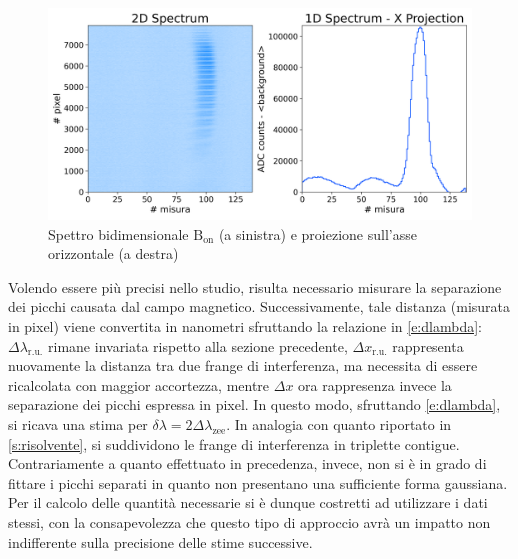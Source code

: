 \documentclass[twocolumn,10pt]{asme2ej}
\begin{document}
\begin{figure}
    \centering
    \includegraphics[width=\linewidth]{../Plots/Bon_2d_spectrum.png}
    \caption{Spettro bidimensionale $\text{B}_{\text{on}}$ (a sinistra) e proiezione sull'asse orizzontale (a destra)}
    \label{i:spettro2d_Bon}
    \vspace{-10pt}
\end{figure}

\noindent Volendo essere più precisi nello studio, risulta necessario misurare la separazione dei picchi causata dal
campo magnetico. Successivamente, tale distanza (misurata in pixel) viene convertita in nanometri sfruttando la
relazione in \autoref{e:dlambda}: $\Delta\lambda_{\text{r.u.}}$ rimane invariata rispetto alla sezione precedente,
$\Delta x_{\text{r.u.}}$ rappresenta nuovamente la distanza tra due frange di interferenza, ma necessita di essere
ricalcolata con maggior accortezza, mentre $\Delta x$ ora rappresenza invece la separazione dei picchi espressa in
pixel. In questo modo, sfruttando \autoref{e:dlambda}, si ricava una stima per $\delta\lambda = 2
\Delta\lambda_{\text{zee}}$. In analogia con quanto riportato in \autoref{s:risolvente}, si suddividono le frange di
interferenza in triplette contigue. Contrariamente a quanto effettuato in precedenza, invece, non si è in grado di
fittare i picchi separati in quanto non presentano una sufficiente forma gaussiana. Per il calcolo delle quantità
necessarie si è dunque costretti ad utilizzare i dati stessi, con la consapevolezza che questo tipo di approccio avrà un
impatto non indifferente sulla precisione delle stime successive.
\end{document}
